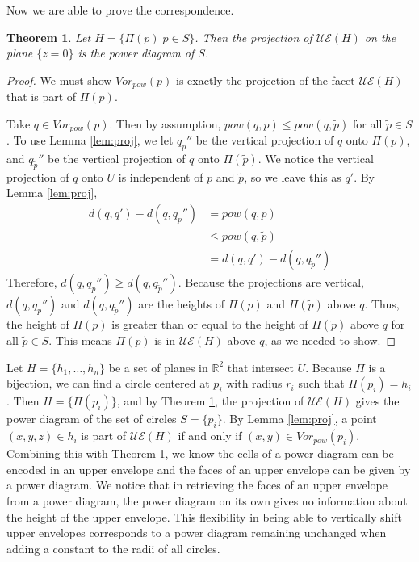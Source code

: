 \documentclass[a4paper, 11pt]{article}
\newtheorem{theorem}{Theorem}[section]
\newcommand{\R}{\mathbb{R}}
\begin{document}
Now we are able to prove the correspondence.

\begin{theorem}
  Let $H = \{ \Pi(p) | p \in S \}$. Then the projection of $\mathcal{UE}(H)$ on the plane $\{ z=0 \}$ is the power diagram of $S$.
  \label{thm:ue_to_pow}
\end{theorem}
\begin{proof}
  We must show $Vor_{pow}(p)$ is exactly the projection of the facet $\mathcal{UE}(H)$ that is part of $\Pi(p)$.

  Take $q \in Vor_{pow}(p)$. Then by assumption, $pow(q,p) \leq pow(q,\tilde{p})$ for all $\tilde{p} \in S$. To use Lemma \ref{lem:proj}, we let $q_p''$ be the
  vertical projection of $q$ onto $\Pi(p)$, and $q_{\tilde{p}}''$ be the vertical projection of $q$ onto $\Pi(\tilde{p})$. We notice the vertical projection
  of $q$ onto $U$ is independent of $p$ and $\tilde{p}$, so we leave this as $q'$. By Lemma \ref{lem:proj},
  \begin{align*}
    d(q,q') - d(q,q_p'') &= pow(q,p) \\
    &\leq pow(q,\tilde{p}) \\
    &= d(q,q') - d(q,q_{\tilde{p}}'')
  \end{align*}
  Therefore, $d(q,q_p'') \geq d(q, q_{\tilde{p}}'')$. Because the projections are vertical, $d(q,q_p'')$ and $d(q, q_{\tilde{p}}'')$ are the heights of
  $\Pi(p)$ and $\Pi(\tilde{p})$ above $q$. Thus, the height of $\Pi(p)$ is greater than or equal to the height of $\Pi(\tilde{p})$ above $q$ for all
  $\tilde{p} \in S$. This means $\Pi(p)$ is in $\mathcal{UE}(H)$ above $q$, as we needed to show.
\end{proof}

Let $H = \{ h_1,\dots, h_n \}$ be a set of planes in $\R^2$ that intersect $U$. Because $\Pi$ is a bijection, we can find a circle centered at $p_i$
with radius $r_i$ such that $\Pi( p_i ) = h_i$. Then $H = \{ \Pi(p_i) \}$, and by Theorem \ref{thm:ue_to_pow}, the projection of $\mathcal{UE}(H)$ gives the
power diagram of the set of circles $S = \{ p_i \}$. By Lemma \ref{lem:proj}, a point $(x,y,z) \in h_i$ is part of $\mathcal{UE}(H)$ if and only if $(x,y) \in
Vor_{pow}(p_i)$. Combining this with Theorem \ref{thm:ue_to_pow}, we know the cells of a power diagram can be encoded in an upper envelope and the
faces of an upper envelope can be given by a power diagram. We notice that in retrieving the faces of an upper envelope from a power diagram, the
power diagram on its own gives no information about the height of the upper envelope. This flexibility in being able to vertically shift upper
envelopes corresponds to a power diagram remaining unchanged when adding a constant to the radii of all circles.
\end{document}
